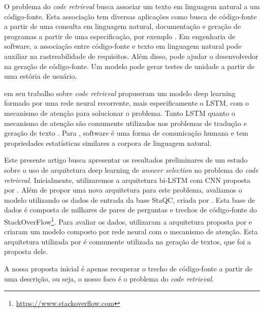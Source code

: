 \documentclass[12pt]{article}
\begin{document}
O problema do \textit{code retrieval} busca associar um texto em linguagem natural a um código-fonte. Esta associação tem diversas aplicações como busca de código-fonte a partir de uma consulta em linguagem natural, documentação e geração de programas a partir de uma especificação, por exemplo \cite{Allamanis:2018:SML}. Em engenharia de software, a associação entre código-fonte e texto em linguagem natural pode auxiliar na rastreabilidade de requisitos. Além disso, pode ajudar o desenvolvedor na geração de código-fonte. Um modelo pode gerar testes de unidade a partir de uma estória de usuário.

\cite{iyer-etal-2016-summarizing} em seu trabalho sobre \textit{code retrieval} propuseram um modelo deep learning formado por uma rede neural recorrente, mais especificamente o LSTM, com o mecanismo de atenção para solucionar o problema. Tanto LSTM quanto o mecanismo de atenção são comumente utilizados nos problemas de tradução e geração de texto \cite{bahdanau2014neural, rush-etal-2015-neural}. Para \cite{Allamanis:2018:SML}, software é uma forma de comunicação humana e tem propriedades estatísticas similares a corpora de linguagem natural. 

Este presente artigo busca apresentar os resultados preliminares de um estudo sobre o uso de arquitetura deep learning de \textit{answer selection} no problema do \textit{code retrieval}. Inicialmente, utilizaremos a arquitetura bi-LSTM com CNN proposta por \cite{tan-lstm-qa}. Além de propor uma nova arquitetura para este problema, avaliamos o modelo utilizando os dados de entrada da base StaQC, criada por \cite{Yao-staqc:2018}. Esta base de dados é composta de milhares de pares de perguntas e trechos de código-fonte do StackOverFlow\footnote{\url{https://www.stackoverflow.com}}. Para avaliar os dados, \cite{Yao-staqc:2018} utilizaram a arquitetura proposta por \cite{iyer-etal-2016-summarizing} e criaram um modelo composto por rede neural com o mecanismo de atenção. Esta arquitetura utilizada por \cite{iyer-etal-2016-summarizing} é comumente utilizada na geração de textos, que foi a proposta dele. 

 A nossa proposta inicial é apenas recuperar o trecho de código-fonte a partir de uma descrição, ou seja, o nosso foco é o problema do \textit{code retrieval}.



\end{document}

